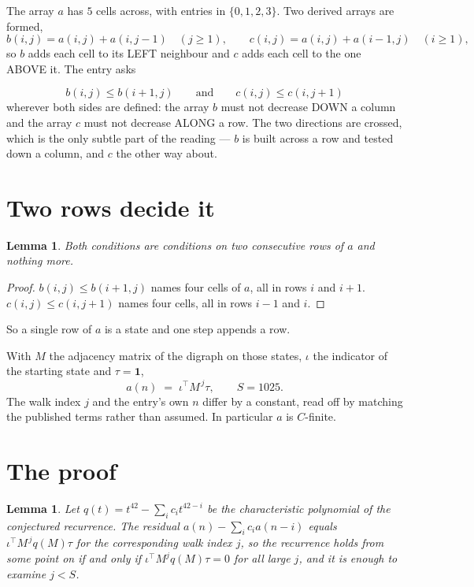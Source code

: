 \documentclass[11pt,a4paper]{article}
\theoremstyle{plain}
\newtheorem{lemma}[theorem]{Lemma}
\theoremstyle{definition}
\begin{document}
The array $a$ has $5$ cells across, with entries in $\{0,1,2,3\}$. Two derived arrays are formed,
\[
b(i,j)=a(i,j)+a(i,j-1)\quad(j\ge1),\qquad c(i,j)=a(i,j)+a(i-1,j)\quad(i\ge1),
\]
so $b$ adds each cell to its LEFT neighbour and $c$ adds each cell to the one ABOVE it. The
entry asks

\[
b(i,j)\le b(i{+}1,j)\qquad\text{and}\qquad c(i,j)\le c(i,j{+}1)
\]
wherever both sides are defined: the array $b$ must not decrease DOWN a column and the array
$c$ must not decrease ALONG a row. The two directions are crossed, which is the only subtle
part of the reading --- $b$ is built across a row and tested down a column, and $c$ the other
way about.


\section{Two rows decide it}

\begin{lemma}\label{lem:win}
Both conditions are conditions on two consecutive rows of $a$ and nothing more.
\end{lemma}

\begin{proof}
$b(i,j)\le b(i{+}1,j)$ names four cells of $a$, all in rows $i$ and $i+1$. $c(i,j)\le
c(i,j{+}1)$ names four cells, all in rows $i-1$ and $i$.
\end{proof}

So a single row of $a$ is a state and one step appends a row.

With $M$ the adjacency matrix of the digraph on those states, $\iota$ the indicator of the
starting state and $\tau=\mathbf{1}$,
\[
a(n)\;=\;\iota^{\!\top}M^{\,j}\tau ,\qquad S=1025.
\]
The walk index $j$ and the entry's own $n$ differ by a constant, read off by matching the
published terms rather than assumed. In particular $a$ is $C$-finite.

\section{The proof}

\begin{lemma}\label{lem:crit}
Let $q(t)=t^{42}-\sum_i c_it^{42-i}$ be the characteristic polynomial of the
conjectured recurrence. The residual $a(n)-\sum_ic_ia(n-i)$ equals
$\iota^{\!\top}M^{\,j}q(M)\tau$ for the corresponding walk index $j$, so the recurrence
holds from some point on if and only if $\iota^{\!\top}M^{j}q(M)\tau=0$ for all large $j$,
and it is enough to examine $j<S$.
\end{lemma}
\end{document}
